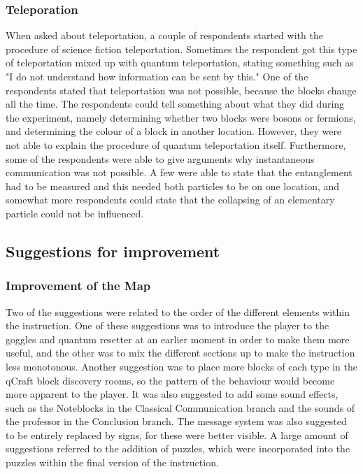 \documentclass[11pt,twoside]{report} %
\begin{document}
\subsubsection{Teleporation}

When asked about teleportation, a couple of respondents started with the procedure of science fiction teleportation. Sometimes the respondent got this type of teleportation mixed up with quantum teleportation, stating something such as "I do not understand how information can be sent by this." One of the respondents stated that teleportation was not possible, because the blocks change all the time. The respondents could tell something about what they did during the experiment, namely determining whether two blocks were bosons or fermions, and determining the colour of a block in another location. However, they were not able to explain the procedure of quantum teleportation itself. Furthermore, some of the respondents were able to give arguments why instantaneous communication was not possible. A few were able to state that the entanglement had to be measured and this needed both particles to be on one location, and somewhat more respondents could state that the collapsing of an elementary particle could not be influenced.

\subsection{Suggestions for improvement}

\subsubsection{Improvement of the Map}

Two of the suggestions were related to the order of the different elements within the instruction. One of these suggestions was to introduce the player to the goggles and quantum resetter at an earlier moment in order to make them more useful, and the other was to mix the different sections up to make the instruction less monotonous. Another suggestion was to place more blocks of each type in the qCraft block discovery rooms, so the pattern of the behaviour would become more apparent to the player. It was also suggested to add some sound effects, such as the Noteblocks in the Classical Communication branch and the sounds of the professor in the Conclusion branch. The message system was also suggested to be entirely replaced by signs, for these were better visible. A large amount of suggestions referred to the addition of puzzles, which were incorporated into the puzzles within the final version of the instruction.
\end{document}
